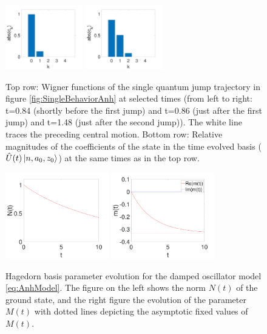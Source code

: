 \documentclass[12pt]{iopart} %
\begin{document}
\begin{figure}
\begin{centering}
	  \includegraphics[width=0.3\textwidth]{HistogramAnh2.pdf}
	  \includegraphics[width=0.3\textwidth]{HistogramAnh3.pdf}
\caption{Top row: Wigner functions of the single quantum jump trajectory in figure \ref{fig:SingleBehaviorAnh} at selected times (from left to right: t=0.84 (shortly before the first jump) and t=0.86 (just after the first jump) and t=1.48 (just after the second jump)). The white line traces the preceding central motion. Bottom row: Relative magnitudes of the coefficients of the state in the time evolved basis ($\hat U(t)\ket{n,a_0,z_0}$) at the same times as in the top row.} \label{fig:WigPlotsAnh_QJ}

\end{centering}
\end{figure}
\begin{figure}[tb] 
\begin{centering}
	  \includegraphics[width=0.4\textwidth]{ntAnh.pdf}
	  \includegraphics[width=0.4\textwidth]{mtAnh.pdf}
\caption{Hagedorn basis parameter evolution for the damped oscillator model \cref{eq:AnhModel}. The figure on the left shows the norm $N(t)$ of the ground state, and the right figure the evolution of the parameter $M(t)$ with dotted lines depicting the asymptotic fixed values of $M(t)$. } \label{fig:HagedornVarsAnh}
\end{centering}
\end{figure}
\end{document}
